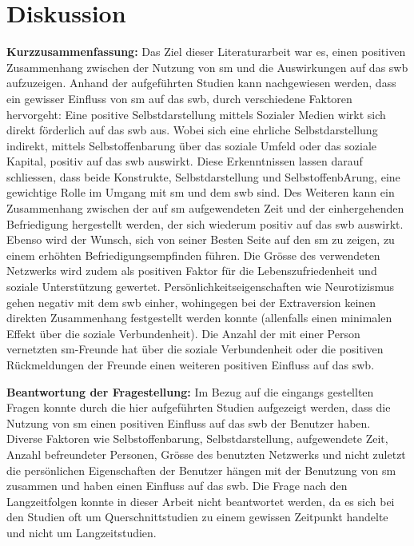 \chapter{Diskussion}\label{chap.diskussion} 
\glsresetall
\textbf{Kurzzusammenfassung:}\newline
Das Ziel dieser Literaturarbeit war es, einen positiven Zusammenhang zwischen der Nutzung von \gls{sm} und die Auswirkungen auf das \gls{swb} aufzuzeigen. Anhand der aufgeführten Studien kann nachgewiesen werden, dass ein gewisser Einfluss von \gls{sm} auf das \gls{swb}, durch verschiedene Faktoren hervorgeht: Eine positive Selbstdarstellung mittels Sozialer Medien wirkt sich direkt förderlich auf das \gls{swb} aus. Wobei sich eine ehrliche Selbstdarstellung indirekt, mittels Selbstoffenbarung über das soziale Umfeld oder das soziale Kapital, positiv auf das \gls{swb} auswirkt. Diese Erkenntnissen lassen darauf schliessen, dass beide Konstrukte, Selbstdarstellung und SelbstoffenbArung, eine gewichtige Rolle im Umgang mit \gls{sm} und dem \gls{swb} sind. Des Weiteren kann ein Zusammenhang zwischen der auf \gls{sm} aufgewendeten Zeit und der einhergehenden Befriedigung hergestellt werden, der sich wiederum positiv auf das \gls{swb} auswirkt. Ebenso wird der Wunsch, sich von seiner Besten Seite auf den \gls{sm} zu zeigen, zu einem erhöhten Befriedigungsempfinden führen. Die Grösse des verwendeten Netzwerks wird zudem als positiven Faktor für die Lebenszufriedenheit und soziale Unterstützung gewertet. Persönlichkeitseigenschaften wie Neurotizismus gehen negativ mit dem \gls{swb} einher, wohingegen bei der Extraversion keinen direkten Zusammenhang festgestellt werden konnte (allenfalls einen minimalen Effekt über die soziale Verbundenheit). Die Anzahl der mit einer Person vernetzten \gls{sm}-Freunde hat über die soziale Verbundenheit oder die positiven Rückmeldungen der Freunde einen weiteren positiven Einfluss auf das \gls{swb}.\par 
\textbf{Beantwortung der Fragestellung:}\newline
Im Bezug auf die eingangs gestellten Fragen konnte durch die hier aufgeführten Studien aufgezeigt werden, dass die Nutzung von \gls{sm} einen positiven Einfluss auf das \gls{swb} der Benutzer haben. Diverse Faktoren wie Selbstoffenbarung, Selbstdarstellung, aufgewendete Zeit, Anzahl befreundeter Personen, Grösse des benutzten Netzwerks und nicht zuletzt die persönlichen Eigenschaften der Benutzer hängen mit der Benutzung von \gls{sm} zusammen und haben einen Einfluss auf das \gls{swb}. Die Frage nach den Langzeitfolgen konnte in dieser Arbeit nicht beantwortet werden, da es sich bei den Studien oft um Querschnittstudien zu einem gewissen Zeitpunkt handelte und nicht um Langzeitstudien. \par 
